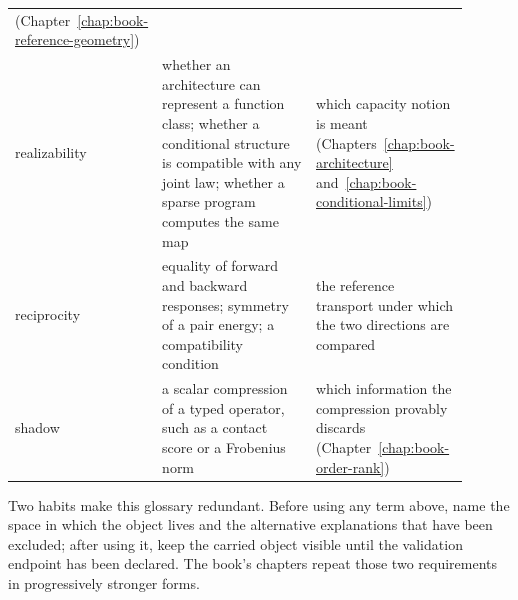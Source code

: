 \begin{center}
\begin{tabular}{@{}>{\raggedright\arraybackslash}p{0.14\linewidth}
                >{\raggedright\arraybackslash}p{0.44\linewidth}
                >{\raggedright\arraybackslash}p{0.32\linewidth}@{}}
(Chapter~\ref{chap:book-reference-geometry}) \\
realizability & whether an architecture can represent a function class; whether a conditional
structure is compatible with any joint law; whether a sparse program computes the same map &
which capacity notion is meant (Chapters~\ref{chap:book-architecture}
and~\ref{chap:book-conditional-limits}) \\
reciprocity & equality of forward and backward responses; symmetry of a pair energy; a
compatibility condition &
the reference transport under which the two directions are compared \\
shadow & a scalar compression of a typed operator, such as a contact score or a Frobenius norm &
which information the compression provably discards
(Chapter~\ref{chap:book-order-rank}) \\
\bottomrule
\end{tabular}
\end{center}

Two habits make this glossary redundant.  Before using any term above, name the space in which
the object lives and the alternative explanations that have been excluded; after using it, keep
the carried object visible until the validation endpoint has been declared.  The book's chapters
repeat those two requirements in progressively stronger forms.
